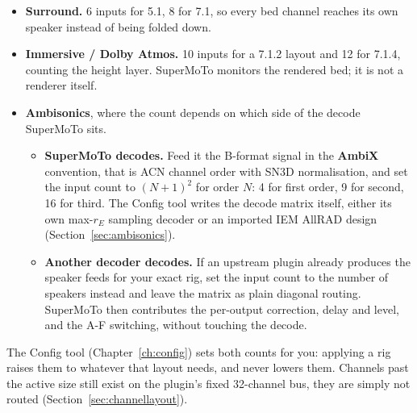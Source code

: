 \begin{itemize}[nosep]
  \item \textbf{Surround.} 6 inputs for 5.1, 8 for 7.1, so every bed channel
        reaches its own speaker instead of being folded down.
  \item \textbf{Immersive / Dolby Atmos.} 10 inputs for a 7.1.2 layout and 12
        for 7.1.4, counting the height layer. SuperMoTo monitors the rendered
        bed; it is not a renderer itself.
  \item \textbf{Ambisonics}, where the count depends on which side of the
        decode SuperMoTo sits.
        \begin{itemize}[nosep]
          \item \textbf{SuperMoTo decodes.} Feed it the B-format signal in the
                \textbf{AmbiX} convention, that is ACN channel order
                with SN3D normalisation, and set the input count to
                $(N+1)^2$ for order $N$: 4 for first order, 9 for second, 16 for
                third. The Config tool writes the decode matrix itself, either
                its own max-$r_E$ sampling decoder or an imported IEM AllRAD
                design (Section~\ref{sec:ambisonics}).
          \item \textbf{Another decoder decodes.} If an upstream plugin
                already produces the speaker feeds for your exact rig, set the
                input count to the number of speakers instead and leave
                the matrix as plain diagonal routing. SuperMoTo then contributes the
                per-output correction, delay and level, and the A-F switching,
                without touching the decode.
        \end{itemize}
\end{itemize}

The Config tool (Chapter~\ref{ch:config}) sets both counts for you: applying a rig raises them to whatever that layout needs, and never lowers them. Channels past the active size still exist on the plugin's fixed 32-channel bus, they are simply not routed (Section~\ref{sec:channellayout}).

